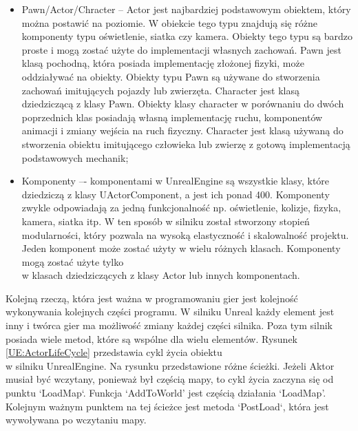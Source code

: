 \documentclass[12pt,twoside]{article}
\begin{document}
\begin{itemize}
\item Pawn/Actor/Chracter -- Actor jest najbardziej podstawowym obiektem, który
można postawić na poziomie. W obiekcie tego typu znajdują się różne komponenty
typu oświetlenie, siatka czy kamera. Obiekty tego typu są bardzo proste i mogą
zostać użyte do implementacji własnych zachowań. Pawn jest klasą pochodną, która
posiada implementację złożonej fizyki, może oddziaływać na obiekty. Obiekty typu
Pawn są używane do stworzenia zachowań imitujących pojazdy lub zwierzęta.
Character jest klasą dziedziczącą z klasy Pawn. Obiekty klasy character w
porównaniu do dwóch poprzednich klas posiadają własną implementację ruchu,
komponentów animacji i zmiany wejścia na ruch fizyczny. Character jest klasą
używaną do stworzenia obiektu imitującego człowieka lub zwierzę z gotową
implementacją podstawowych mechanik\cite{UE:Actor,UE:Pawn,UE:Character};

\item Komponenty –- komponentami w UnrealEngine są wszystkie klasy, które
dziedziczą z klasy UActorComponent, a jest ich ponad 400. Komponenty zwykle
odpowiadają za jedną funkcjonalność np. oświetlenie, kolizje, fizyka, kamera,
siatka itp.  W ten sposób w silniku został stworzony stopień modularności, który
pozwala na wysoką elastyczność i skalowalność projektu. Jeden komponent może
zostać użyty w wielu różnych klasach. Komponenty mogą zostać użyte tylko\\w
klasach dziedziczących z klasy Actor lub innych komponentach\cite{UE:Component}.


\end{itemize}

Kolejną rzeczą, która jest ważna w programowaniu gier jest kolejność wykonywania
kolejnych części programu. W silniku Unreal każdy element jest inny i twórca
gier ma możliwość zmiany każdej części silnika. Poza tym silnik posiada wiele
metod, które są wspólne dla wielu elementów. Rysunek \ref{UE:ActorLifeCycle}
przedstawia cykl życia obiektu\\w silniku UnrealEngine. Na rysunku przedstawione
różne ścieżki. Jeżeli Aktor musiał być wczytany, ponieważ był częścią mapy, to
cykl życia zaczyna się od punktu `LoadMap`. Funkcja ‘AddToWorld’ jest częścią
działania ‘LoadMap’. Kolejnym ważnym punktem na tej ścieżce jest metoda
`PostLoad`, która jest wywoływana po wczytaniu mapy. 
\end{document}
